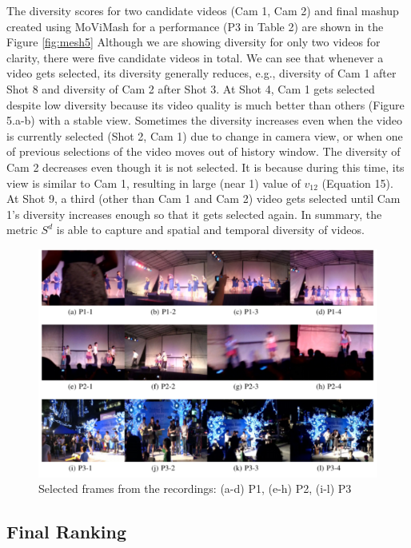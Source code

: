 \documentclass{sig-alternate}
\begin{document}
The diversity scores for two candidate videos (Cam 1, Cam 2)
and final mashup created using MoViMash for a performance (P3
in Table 2) are shown in the Figure \ref{fig:mesh5} Although we are showing
diversity for only two videos for clarity, there were five candidate
videos in total. We can see that whenever a video gets selected,
its diversity generally reduces, e.g., diversity of Cam 1 after Shot 8
and diversity of Cam 2 after Shot 3. At Shot 4, Cam 1 gets selected
despite low diversity because its video quality is much better than
others (Figure 5.a-b) with a stable view. Sometimes the diversity
increases even when the video is currently selected (Shot 2, Cam 1)
due to change in camera view, or when one of previous selections
of the video moves out of history window. The diversity of Cam 2
decreases even though it is not selected. It is because during this
time, its view is similar to Cam 1, resulting in large (near 1) value
of $v_{12}$ (Equation 15). At Shot 9, a third (other than Cam 1 and Cam
2) video gets selected until Cam 1's diversity increases enough so
that it gets selected again. In summary, the metric $S^d$ is able to
capture and spatial and temporal diversity of videos.


\begin{figure}[h]
    \includegraphics[width=1\textwidth]{img6.png}
    \caption{Selected frames from the recordings: (a-d) P1, (e-h) P2, (i-l) P3}
    \label{fig:mesh6}
\end{figure}


\subsection{Final Ranking}
\end{document}
